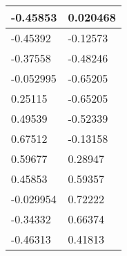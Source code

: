 \begin{tabular}{|l|l|}
\hline
-0.45853&0.020468\\\hline
-0.45392&-0.12573\\\hline
-0.37558&-0.48246\\\hline
-0.052995&-0.65205\\\hline
0.25115&-0.65205\\\hline
0.49539&-0.52339\\\hline
0.67512&-0.13158\\\hline
0.59677&0.28947\\\hline
0.45853&0.59357\\\hline
-0.029954&0.72222\\\hline
-0.34332&0.66374\\\hline
-0.46313&0.41813\\\hline
\end{tabular}
